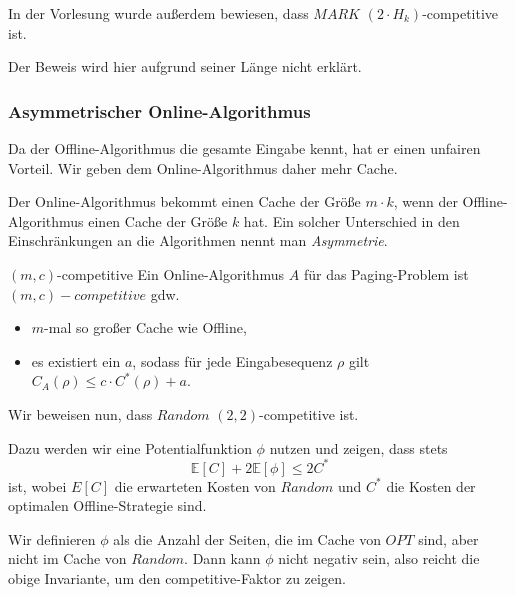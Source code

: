\documentclass{panikzettel}
\begin{document}
In der Vorlesung wurde außerdem bewiesen, dass $MARK$ $(2 \cdot H_k)$-competitive ist.

Der Beweis wird hier aufgrund seiner Länge nicht erklärt.

\subsubsection{Asymmetrischer Online-Algorithmus}
\begin{halfboxl}
Da der Offline-Algorithmus die gesamte Eingabe kennt, hat er einen unfairen Vorteil. Wir geben dem Online-Algorithmus daher mehr Cache.

Der Online-Algorithmus bekommt einen Cache der Größe $m \cdot k$, wenn der Offline-Algorithmus einen Cache der Größe $k$ hat. Ein solcher Unterschied in den Einschränkungen an die Algorithmen nennt man \emph{Asymmetrie}.
\end{halfboxl}%
\begin{halfboxr}
\vspace{-\baselineskip}
\begin{defi}{$(m,c)$-competitive}
    Ein Online-Algorithmus $A$ für das Paging-Problem ist $(m,c)-competitive$ gdw.
    \begin{itemize}
        \item $m$-mal so großer Cache wie Offline,
        \item es existiert ein $a$, sodass für jede Eingabesequenz $\rho$ gilt $C_A(\rho) \leq c \cdot C^*(\rho)+a$.
    \end{itemize}
\end{defi}
\end{halfboxr}

Wir beweisen nun, dass $Random$ $(2,2)$-competitive ist.

Dazu werden wir eine Potentialfunktion $\phi$ nutzen und zeigen, dass stets
\[\mathbb{E}[C] + 2\mathbb{E}[\phi] \le 2 C^\ast\]
ist, wobei $E[C]$ die erwarteten Kosten von $Random$ und $C^\ast$ die Kosten der optimalen Offline-Strategie sind.

Wir definieren $\phi$ als die Anzahl der Seiten, die im Cache von $OPT$ sind, aber nicht im Cache von $Random$. Dann kann $\phi$ nicht negativ sein, also reicht die obige Invariante, um den competitive-Faktor zu zeigen.
\end{document}
